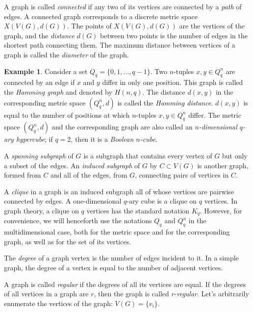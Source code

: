 \documentclass[11pt]{article}
\theoremstyle{definition}
\newtheorem{example}{Example}[section]
\begin{document}
A graph is called
{\sl connected} if any two of its vertices are connected by a {\sl path} of
edges. A connected graph corresponds to a discrete metric
space $X(V(G),d(G))$. The points of $X(V(G),d(G))$ are the vertices of the graph, and the {\sl distance} $d(G)$ between
two points
is the number of edges in the shortest path connecting them.
 The maximum distance between vertices of a graph is called the {\sl diameter} of the graph.

\begin{example}
Consider a set $Q_q=\{0,1,\dots,q-1\}$. Two $n$-tuples $x,y\in Q^n_q$ are connected by  an edge if $x$ and $y$  differ in only one position. This graph is called the {\sl Hamming graph} and denoted by $H(n,q)$. The distance  $d(x,y)$ in the corresponding metric  space $(Q^n_q, d)$  is called  the {\sl Hamming distance}.  $d(x,y)$ is equal to the number of positions at
which $n$-tuples $x,y\in Q^n_q$ differ. The metric
space $(Q^n_q, d)$ and the corresponding graph are also 
called an {\sl $n$-dimensional $q$-ary hypercube}; if $q=2$, then it is a {\sl Boolean $n$-cube}.
\end{example}


A {\sl spanning subgraph} of $G$  is a subgraph that contains every vertex of $G$ but only a subset of the edges.  An {\sl induced subgraph} of $G$ by $C\subset V(G)$ is another graph, formed from $C$ and all of the edges, from $G$, connecting pairs of vertices in $C$.

A {\sl clique} in a graph is an induced subgraph all of whose vertices
are pairwise connected by edges. A one-dimensional $q$-ary cube is a 
clique on $q$ vertices. In graph theory, a clique on $q$ vertices
has the standard notation $K_q$. However, for convenience, we will henceforth use the notations $Q_q$ and $Q^n_q$ in the multidimensional case, both for the metric space and for the corresponding graph, as well as for the set of its vertices.

The {\sl degree} of a graph vertex is the number of edges incident to it. In a simple graph, the degree of a vertex is equal to the number of adjacent vertices.

A graph is called {\sl regular} if the degrees of all its vertices are equal.
If the degrees of all vertices in a graph are $r$, then the graph is called $r$-{\sl regular}. Let's  arbitrarily enumerate the vertices of the graph:
$V(G)=\{v_i\}$.
\end{document}
